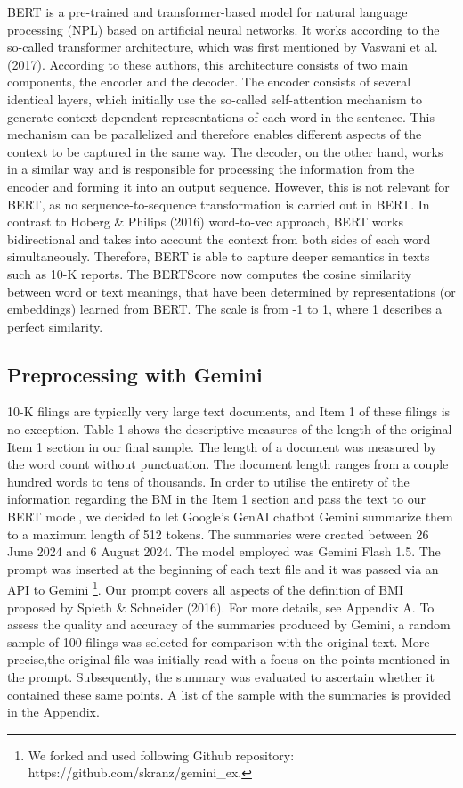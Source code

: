 \documentclass[
]{article}
\begin{document}
BERT is a pre-trained and transformer-based model for natural language
processing (NPL) based on artificial neural networks. It works according
to the so-called transformer architecture, which was first mentioned by
Vaswani et al. (2017). According to these authors, this architecture
consists of two main components, the encoder and the decoder. The
encoder consists of several identical layers, which initially use the
so-called self-attention mechanism to generate context-dependent
representations of each word in the sentence. This mechanism can be
parallelized and therefore enables different aspects of the context to
be captured in the same way. The decoder, on the other hand, works in a
similar way and is responsible for processing the information from the
encoder and forming it into an output sequence. However, this is not
relevant for BERT, as no sequence-to-sequence transformation is carried
out in BERT. In contrast to Hoberg \& Philips (2016) word-to-vec
approach, BERT works bidirectional and takes into account the context
from both sides of each word simultaneously. Therefore, BERT is able to
capture deeper semantics in texts such as 10-K reports. The BERTScore
now computes the cosine similarity between word or text meanings, that
have been determined by representations (or embeddings) learned from
BERT. The scale is from -1 to 1, where 1 describes a perfect similarity.

\subsection{Preprocessing with Gemini}\label{preprocessing-with-gemini}

10-K filings are typically very large text documents, and Item 1 of
these filings is no exception. Table 1 shows the descriptive measures of
the length of the original Item 1 section in our final sample. The
length of a document was measured by the word count without punctuation.
The document length ranges from a couple hundred words to tens of
thousands. In order to utilise the entirety of the information regarding
the BM in the Item 1 section and pass the text to our BERT model, we
decided to let Google's GenAI chatbot Gemini summarize them to a maximum
length of 512 tokens. The summaries were created between 26 June 2024
and 6 August 2024. The model employed was Gemini Flash 1.5. The prompt
was inserted at the beginning of each text file and it was passed via an
API to Gemini \footnote{We forked and used following Github repository:
  https://github.com/skranz/gemini\_ex.}. Our prompt covers all aspects
of the definition of BMI proposed by Spieth \& Schneider (2016). For
more details, see Appendix A. To assess the quality and accuracy of the
summaries produced by Gemini, a random sample of 100 filings was
selected for comparison with the original text. More precise,the
original file was initially read with a focus on the points mentioned in
the prompt. Subsequently, the summary was evaluated to ascertain whether
it contained these same points. A list of the sample with the summaries
is provided in the Appendix.
\end{document}

